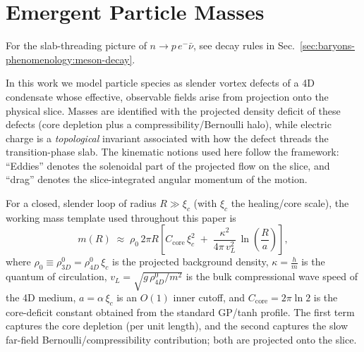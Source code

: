 \section{Emergent Particle Masses}\label{sec:emergent-particles}


For the slab-threading picture of $n\!\to\! p\,e^-\bar\nu$, see decay rules in Sec.~\ref{sec:baryons-phenomenology:meson-decay}.
\medskip

In this work we model particle species as slender vortex defects of a 4D condensate whose effective, observable fields arise from projection onto the physical slice. Masses are identified with the projected density deficit of these defects (core depletion plus a compressibility/Bernoulli halo), while electric charge is a \emph{topological} invariant associated with how the defect threads the transition-phase slab. The kinematic notions used here follow the framework: ``Eddies'' denotes the solenoidal part of the projected flow on the slice, and ``drag'' denotes the slice-integrated angular momentum of the motion.

For a closed, slender loop of radius $R\gg\xi_c$ (with $\xi_c$ the healing/core scale), the working mass template used throughout this paper is
\begin{equation}
\label{eq:mass-template}
m(R)\;\approx\;\rho_0\,2\pi R\left[
C_{\mathrm{core}}\,\xi_c^2\;+\;\frac{\kappa^2}{4\pi\,v_L^2}\,
\ln\!\left(\frac{R}{a}\right)\right],
\end{equation}
where $\rho_0\equiv \rho_{3D}^0=\rho_{4D}^0\,\xi_c$ is the projected background density, $\kappa=\frac{h}{m}$ is the quantum of circulation, $v_L=\sqrt{g\,\rho_{4D}^0/m^{2}}$ is the bulk compressional wave speed of the 4D medium, $a=\alpha\,\xi_c$ is an $O(1)$ inner cutoff, and $C_{\mathrm{core}}=2\pi\ln 2$ is the core-deficit constant obtained from the standard GP/tanh profile. The first term captures the core depletion (per unit length), and the second captures the slow far-field Bernoulli/compressibility contribution; both are projected onto the slice.

